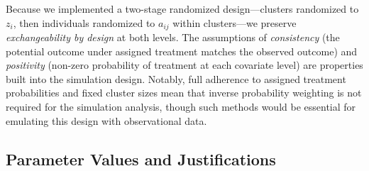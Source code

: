 Because we implemented a two-stage randomized design—clusters randomized to $z_i$, then individuals
randomized to $a_{ij}$ within clusters—we preserve \textit{exchangeability by design} at both levels.
The assumptions of \textit{consistency} (the potential outcome under assigned treatment matches the
observed outcome) and \textit{positivity} (non-zero probability of treatment at each covariate level)
are properties built into the simulation design. Notably, full adherence to assigned treatment
probabilities and fixed cluster sizes mean that inverse probability weighting is not required for
the simulation analysis, though such methods would be essential for emulating this design with
observational data.



\subsection{Parameter Values and Justifications}


